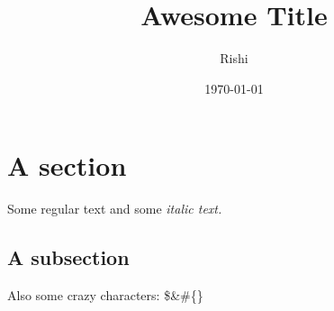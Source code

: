 \documentclass{article}%
\title{Awesome Title}%
\author{Rishi}%
\date{\today}%
\begin{document}
%
\normalsize%
\maketitle%
\section{A section}%
\label{sec:A section}%
Some regular text and some %
\textit{italic text. }%
\subsection{A subsection}%
\label{subsec:A subsection}%
Also some crazy characters: \$\&\#\{\}

%
\end{document}
